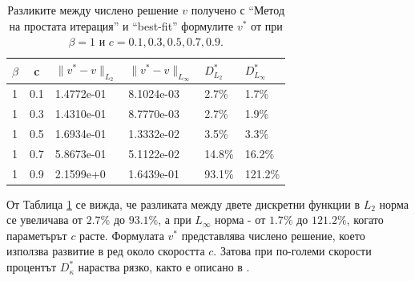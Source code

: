 \documentclass{article}
\theoremstyle{remark}
\begin{document}
\begin{table}[ht]
\centering
\begin{tabular}{|l|c|l l|l l|}
\hline 
\hline 
$\beta$	& c 	& $\|v^*-v \|_{L_2 }$ & $\|v^*-v \|_{L_\infty }$  	& $D^*_{L_2}$	& $D^*_{L_\infty }$	\\
\hline 
1& 		0.1	&	1.4772e-01 		& 	8.1024e-03 				& 2.7\%			& 1.7\%		\\
\hline 
1& 		0.3 	&	1.4310e-01 		& 	8.7770e-03				& 2.7\%			& 1.9\%		\\
\hline 
1& 		0.5 	&	1.6934e-01 		& 	1.3332e-02				& 3.5\%			& 3.3\%		\\
\hline 
1& 		0.7 	&	5.8673e-01		& 	5.1122e-02				& 14.8\%		& 16.2\%	\\
\hline 
1& 		0.9	&	2.1599e+0 		& 	1.6439e-01				& 93.1\%		& 121.2\%	\\
\hline 
\hline 
\end{tabular}
\caption{Разликите между числено решение $v$ получено с ``Метод на простата итерация'' и ``best-fit'' формулите $v^*$ от \cite{Ch2011} при $\beta=1$ и $c=0.1, 0.3, 0.5, 0.7, 0.9$.}
\label{tab:diff-beta1}
\end{table}
От Таблица \ref{tab:diff-beta1} се вижда, че разликата между двете дискретни функции в $L_2$ норма се увеличава от $2.7\%$ до $93.1\%$, а при $L_\infty$ норма - от $1.7\%$ до $121.2\%$, когато параметърът $c$ расте. Формулата $v^*$ представлява числено решение, което използва развитие в ред около скоростта $c$. Затова при по-големи скорости процентът $D^*_{\kappa}$ нараства рязко, както е описано в \cite{Ch2011}.

\end{document}
